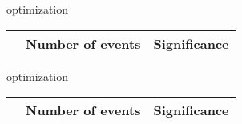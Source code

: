 \begin{frame}{optimization}
\tiny

\begin{tabular}{|c|c|c|}
\hline
& Number of events & Significance \\
\hline

\end{tabular}
\end{frame}

\begin{frame}{optimization}
\tiny

\begin{tabular}{|c|c|c|}
\hline
& Number of events & Significance \\
\hline

\end{tabular}
\end{frame}

